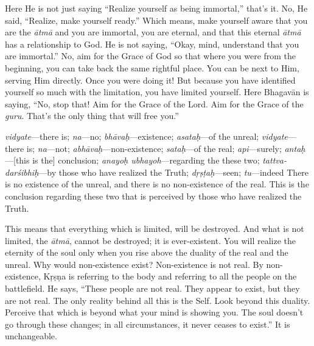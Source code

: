 Here He is not just saying “Realize yourself as being immortal,” that’s it. No, He said, “Realize, make yourself ready.” Which means, make yourself aware that you are the \textit{ātmā} and you are immortal, you are eternal, and that this eternal \textit{ātmā} has a relationship to God. He is not saying, “Okay, mind, understand that you are immortal.” No, aim for the Grace of God so that where you were from the beginning, you can take back the same rightful place. You can be next to Him, serving Him directly. Once you were doing it! But because you have identified yourself so much with the limitation, you have limited yourself. Here Bhagavān is saying, “No, stop that! Aim for the Grace of the Lord. Aim for the Grace of the \textit{guru}. That’s the only thing that will free you.”


{%
  \textit{vidyate}---there is; 
  \textit{na}---no; 
  \textit{bhāvaḥ}---existence; 
  \textit{asataḥ}---of the unreal; 
  \textit{vidyate}---there is; 
  \textit{na}---not; 
  \textit{abhāvaḥ}---non-existence; 
  \textit{sataḥ}---of the real; 
  \textit{api}---surely; 
  \textit{antaḥ}---[this is the] conclusion; 
  \textit{anayoḥ ubhayoh}---regarding the these two; 
  \textit{tattva-darśibhiḥ}---by those who have realized the Truth; 
  \textit{dṛṣṭaḥ}---seen; 
  \textit{tu}---indeed
}
{%
  There is no existence of the unreal, and there is no non-existence of the real. This is the conclusion regarding these two that is perceived by those who have realized the Truth.
}

This means that everything which is limited, will be destroyed. And what is not limited, the \textit{ātmā}, cannot be destroyed; it is ever-existent. You will realize the eternity of the soul only when you rise above the duality of the real and the unreal. Why would non-existence exist? Non-existence is not real. By non-existence, Kṛṣṇa is referring to the body and referring to all the people on the battlefield. He says, “These people are not real. They appear to exist, but they are not real. The only reality behind all this is the Self. Look beyond this duality. Perceive that which is beyond what your mind is showing you. The soul doesn’t go through these changes; in all circumstances, it never ceases to exist.” It is unchangeable.

